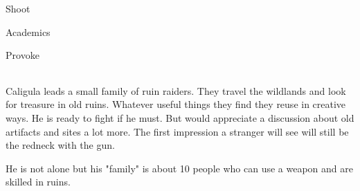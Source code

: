 \begin{npcBox}[title=Caligula]

    \begin{aspects}
    \item {}
    \item {}    
    \end{aspects}
    
    \begin{skills}
    \item {} Shoot
    \item {} Academics
    \item {} Provoke
    \end{skills}
    
    \begin{stunts}
    \item {}
    \end{stunts}
    
    \begin{stressSection}
    \end{stressSection}
    \begin{tabularx}{\textwidth}{ XX }
    \end{tabularx}
    
    \begin{consequences}
    \item {}
    \item {}
    \item {}
    \end{consequences}
    
    \begin{npcDescription}
    Caligula leads a small family of ruin raiders. They travel the wildlands and look for treasure in old ruins. Whatever useful things they find they reuse in creative ways.
    He is ready to fight if he must. But would appreciate a discussion about old artifacts and sites a lot more. The first impression a stranger will see will still be the redneck with the gun.
    \end{npcDescription}
    
    \end{npcBox}

He is not alone but his "family" is about 10 people who can use a weapon and are skilled in ruins.

